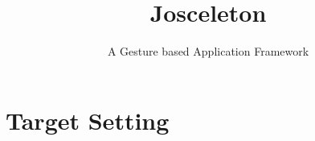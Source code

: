 \documentclass[a4paper,12pt]{article}
\title{Josceleton}
\author{A Gesture based Application Framework}
\begin{document}
\maketitle

\section{Target Setting}


\end{document}
